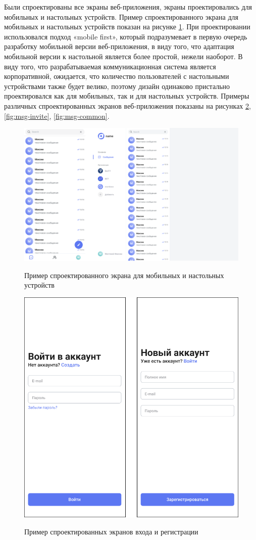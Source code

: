Были спроектированы все экраны веб-приложения, экраны проектировались для мобильных и настольных устройств. Пример спроектированного экрана для мобильных и настольных устройств показан на рисунке \ref{fig:msg-adaptive}. При проектировании использовался подход «mobile first», который подразумевает в первую очередь разработку мобильной версии веб-приложения, в виду того, что адаптация мобильной версии к настольной является более простой, нежели наоборот. В виду того, что разрабатываемая коммуникационная система является корпоративной, ожидается, что количество пользователей с настольными устройствами также будет велико, поэтому дизайн одинаково пристально проектировался как для мобильных, так и для настольных устройств. Примеры различных спроектированных экранов веб-приложения показаны на рисунках \ref{fig:msg-auth}, \ref{fig:msg-invite}, \ref{fig:msg-common}.

\begin{figure}[H]
\begin{center}
\includegraphics[width=0.8\hsize]{fig/msg-adaptive.png}\\[2mm]
\caption{Пример спроектированного экрана для мобильных и настольных устройств}\label{fig:msg-adaptive}
\end{center}
\end{figure}

\begin{figure}[H]
\begin{center}
\includegraphics[width=0.5\hsize]{fig/msg-auth.png}\\[2mm]
\caption{Пример спроектированных экранов входа и регистрации}\label{fig:msg-auth}
\end{center}
\end{figure}

